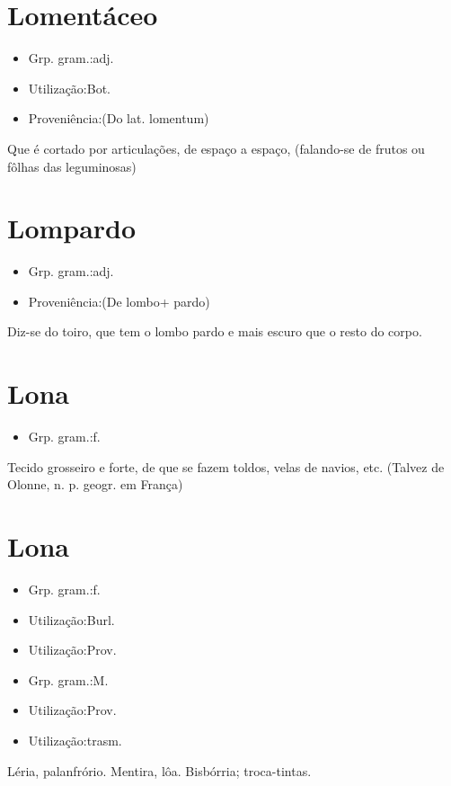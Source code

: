 \section{Lomentáceo}
\begin{itemize}
\item {Grp. gram.:adj.}
\end{itemize}
\begin{itemize}
\item {Utilização:Bot.}
\end{itemize}
\begin{itemize}
\item {Proveniência:(Do lat. \textunderscore lomentum\textunderscore )}
\end{itemize}
Que é cortado por articulações, de espaço a espaço, (falando-se de frutos ou fôlhas das leguminosas)
\section{Lompardo}
\begin{itemize}
\item {Grp. gram.:adj.}
\end{itemize}
\begin{itemize}
\item {Proveniência:(De \textunderscore lombo\textunderscore  + \textunderscore pardo\textunderscore )}
\end{itemize}
Diz-se do toiro, que tem o lombo pardo e mais escuro que o resto do corpo.
\section{Lona}
\begin{itemize}
\item {Grp. gram.:f.}
\end{itemize}
Tecido grosseiro e forte, de que se fazem toldos, velas de navios, etc.
(Talvez de \textunderscore Olonne\textunderscore , n. p. geogr. em França)
\section{Lona}
\begin{itemize}
\item {Grp. gram.:f.}
\end{itemize}
\begin{itemize}
\item {Utilização:Burl.}
\end{itemize}
\begin{itemize}
\item {Utilização:Prov.}
\end{itemize}
\begin{itemize}
\item {Grp. gram.:M.}
\end{itemize}
\begin{itemize}
\item {Utilização:Prov.}
\end{itemize}
\begin{itemize}
\item {Utilização:trasm.}
\end{itemize}
Léria, palanfrório.
Mentira, lôa.
Bisbórria; troca-tintas.
